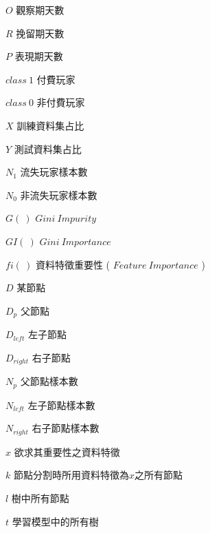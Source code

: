 %
\begin{SymEntry}

    \item[$O$]
    觀察期天數

    \item[$R$]
    挽留期天數
    
    \item[$P$]
    表現期天數
    
    \item[$class\ 1$]
    付費玩家

    \item[$class\ 0$]
    非付費玩家

    \item[$X$]
    訓練資料集占比
    
    \item[$Y$]
    測試資料集占比
    
    \item[$N_1$]
    流失玩家樣本數

    \item[$N_0$]
    非流失玩家樣本數
    
    \item[$G(\ )$]
    $Gini\ Impurity$

    \item[$GI(\ )$]
    $Gini\ Importance$

    \item[$fi(\ )$]
    資料特徵重要性 ( $Feature\ Importance$ )

    \item[$D$]
    某節點

    \item[$D_p$]
    父節點

    \item[$D_{left}$]
    左子節點

    \item[$D_{right}$]
    右子節點

    \item[$N_p$]
    父節點樣本數

    \item[$N_{left}$]
    左子節點樣本數

    \item[$N_{right}$]
    右子節點樣本數

    \item[$x$]
    欲求其重要性之資料特徵

    \item[$k$]
    節點分割時所用資料特徵為$x$之所有節點

    \item[$l$]
    樹中所有節點

    \item[$t$]
    學習模型中的所有樹

\end{SymEntry}